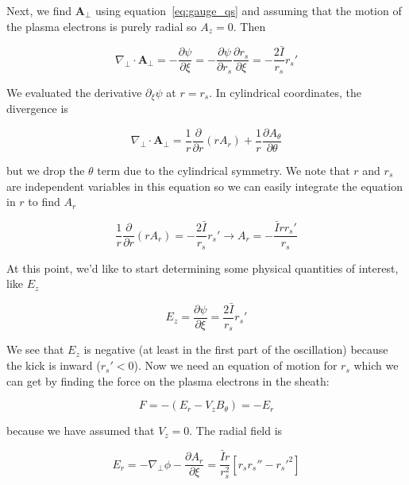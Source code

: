 \documentclass[aps,prl,preprint,groupedaddress]{revtex4-1}
\begin{document}
Next, we find $\mathbf{A}_{\perp}$ using equation~\ref{eq:gauge_qs} and assuming that the motion of the plasma electrons is purely radial so $A_z = 0$. Then

\begin{equation}\label{eq:a_perp}
\nabla_\perp \cdot \mathbf{A}_\perp = -\frac{\partial \psi}{\partial \xi} = - \frac{\partial \psi}{\partial r_s}\frac{\partial r_s}{\partial \xi} = -\frac{2\bar{I}}{r_s}r_s'
\end{equation}

We evaluated the derivative $\partial_\xi \psi$ at $r = r_s$. In cylindrical coordinates, the divergence is

\begin{equation}\label{eq:a_perp_cyl}
\nabla_\perp \cdot \mathbf{A}_\perp = \frac{1}{r}\frac{\partial}{\partial r} (r A_r) + \frac{1}{r}\frac{\partial A_{\theta}}{\partial \theta}
\end{equation}

but we drop the $\theta$ term due to the cylindrical symmetry. We note that $r$ and $r_s$ are independent variables in this equation so we can easily integrate the equation in $r$ to find $A_r$

\begin{equation}\label{eq:a_r}
\frac{1}{r}\frac{\partial}{\partial r} (r A_r) = -\frac{2\bar{I}}{r_s}r_s' \rightarrow A_r = -\frac{\bar{I} r r_s'}{r_s}
\end{equation}

At this point, we'd like to start determining some physical quantities of interest, like $E_z$

\begin{equation}\label{eq:E_z}
E_z = \frac{\partial \psi}{\partial \xi} = \frac{2\bar{I}}{r_s}r_s'
\end{equation}

We see that $E_z$ is negative (at least in the first part of the oscillation) because the kick is inward ($r_s' < 0$). Now we need an equation of motion for $r_s$ which we can get by finding the force on the plasma electrons in the sheath:

\begin{equation}\label{eq:force}
F =-(E_r -V_z B_{\theta}) = -E_r
\end{equation}

because we have assumed that $V_z = 0$. The radial field is

\begin{equation}\label{eq:force}
E_r =-\nabla_{\perp} \phi - \frac{\partial A_r}{\partial \xi} = \frac{\bar{I} r}{r_s^2}[r_s r_s'' - r_s'^2]
\end{equation}
\end{document}
